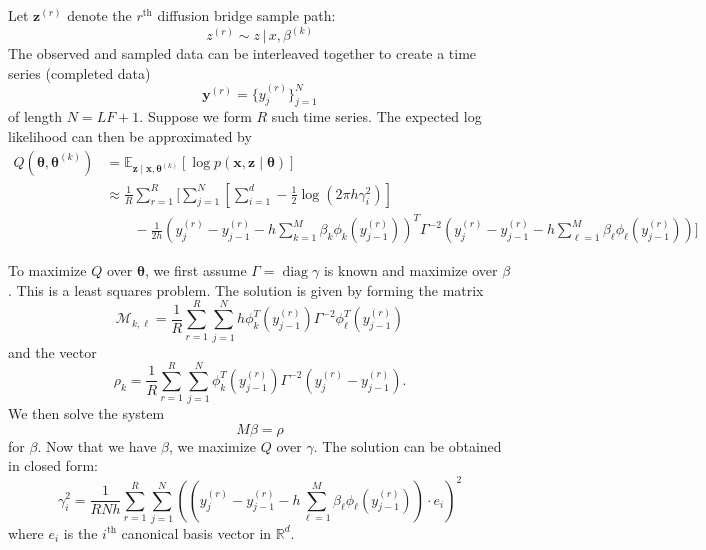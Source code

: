 \documentclass[12pt]{article}
\newcommand{\btheta}{\ensuremath{\boldsymbol{\theta}}}
\newcommand{\opdiag}{\ensuremath{\operatorname{diag}}}
\newcommand{\bx}{\ensuremath{\mathbf{x}}}
\newcommand{\bz}{\ensuremath{\mathbf{z}}}
\begin{document}
Let $\mathbf{z}^{(r)}$ denote the $r^\text{th}$ diffusion bridge sample path:
\begin{equation}
z^{(r)} \sim z \, | \, x, \beta^{(k)}
\end{equation}
The observed and sampled data can be interleaved together to create a time series (completed data)
$$
\mathbf{y}^{(r)} = \{y_j^{(r)}\}_{j=1}^N
$$
of length $N = LF + 1$.  Suppose we form $R$ such time series.  The expected log likelihood can then be approximated by
\begin{align*}
Q(\btheta, \btheta^{(k)}) &= \mathbb{E}_{\bz \mid \bx, \btheta^{(k)}} [\log p(\bx, \bz \mid \btheta)] \\
 &\approx \frac{1}{R} \sum_{r=1}^R \biggl[ \sum_{j=1}^N \left[ \sum_{i=1}^d -\frac{1}{2} \log (2 \pi h \gamma_i^2) \right] \\
 &\qquad -\frac{1}{2h} (y_j^{(r)} - y_{j-1}^{(r)} - h \sum_{k=1}^M \beta_k \phi_k(y_{j-1}^{(r)}))^T \Gamma^{-2} (y_j^{(r)} - y_{j-1}^{(r)} - h \sum_{\ell=1}^M \beta_\ell \phi_\ell(y_{j-1}^{(r)}) ) \biggr] 
\end{align*}

To maximize $Q$ over $\btheta$, we first assume $\Gamma = \opdiag \gamma$ is known and maximize over $\beta$.  This is a least squares problem.  The solution is given by forming the matrix
$$
\mathcal{M}_{k,\ell} = \frac{1}{R} \sum_{r=1}^{R} \sum_{j=1}^N h \phi_k^T (y_{j-1}^{(r)}) \Gamma^{-2} \phi_\ell^T (y_{j-1}^{(r)})
$$
and the vector
$$
\rho_k = \frac{1}{R} \sum_{r=1}^{R} \sum_{j=1}^N \phi_k^T (y_{j-1}^{(r)}) \Gamma^{-2} (y_j^{(r)} - y_{j-1}^{(r)}).
$$
We then solve the system
$$
M \beta = \rho
$$
for $\beta$.  Now that we have $\beta$, we maximize $Q$ over $\gamma$.  The solution can be obtained in closed form:
$$
\gamma_i^2 = \frac{1}{R N h} \sum_{r=1}^{R} \sum_{j=1}^N (( y_j^{(r)} - y_{j-1}^{(r)} - h \sum_{\ell=1}^M \beta_\ell \phi_\ell (y_{j-1}^{(r)}) ) \cdot e_i )^2
$$
where $e_i$ is the $i^\text{th}$ canonical basis vector in $\mathbb{R}^d$.
\end{document}
